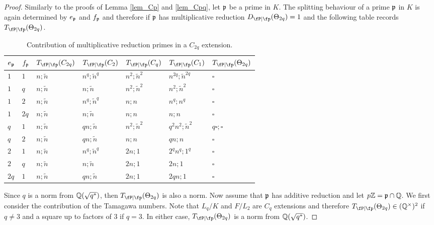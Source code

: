 \begin{proof}
    Similarly to the proofs of Lemma \ref{lem_Cp} and \ref{lem_Cpq}, let $\mathfrak{p}$ be a prime in $K$. The splitting behaviour of a prime $\mathfrak{p}$ in $K$ is again determined by $e_{\mathfrak{p}}$ and $f_{\mathfrak{p}}$ and therefore if $\mathfrak{p}$ has multiplicative reduction $\Dp(\Theta_{2q})=1$ and the following table records $\Tp(\Theta_{2q})$.

    \begin{table}[!ht]
        \centering
        \begin{tabular}{|l|l|l|l|l|l|l|}
        \hline
        $e_{\mathfrak{p}}$ & $f_{\mathfrak{p}}$  & $\Tp(C_{2q})$ & $\Tp(C_2)$ & $\Tp(C_q)$ & $\Tp(C_1)$ & $\Tp(\Theta_{2q})$ \\ \hline
        $1$ & $1$ & $n;\tilde{n}$ & $n^q;\tilde{n}^q$ & $n^2;\tilde{n}^2$ & $n^{2q};\tilde{n}^{2q}$ & $\square$ \\ \hline
        $1$ & $q$ & $n;\tilde{n}$ & $n;\tilde{n}$ & $n^2;\tilde{n}^2$ & $n^2;\tilde{n}^2$ & $\square$ \\ \hline
        $1$ & $2$ & $n;\tilde{n}$ & $n^q;\tilde{n}^q$ & $n;n$ & $n^q;n^q$ & $\square$ \\ \hline
        $1$ & $2q$ & $n;\tilde{n}$ & $n;\tilde{n}$ & $n;n$ & $n;n$ & $\square$ \\ \hline
        $q$ & $1$ & $n;\tilde{n}$ & $qn;\tilde{n}$ & $n^2;\tilde{n}^2$ & $q^2n^2;\tilde{n}^2$ & $q\square;\square$ \\ \hline
        $q$ & $2$ & $n;\tilde{n}$ & $qn;\tilde{n}$ & $n;n$ & $qn;n$ & $\square$ \\ \hline
        $2$ & $1$ & $n;\tilde{n}$ & $n^q;\tilde{n}^q$ & $2n;1$ & $2^qn^q;1^q$ & $\square$ \\ \hline
        $2$ & $q$ & $n;\tilde{n}$ & $n;\tilde{n}$ & $2n;1$ & $2n;1$ & $\square$ \\ \hline
        $2q$ & $1$ & $n;\tilde{n}$ & $qn;\tilde{n}$ & $2n;1$ & $2qn;1$ & $\square$ \\ \hline
        \end{tabular}
        \caption{Contribution of multiplicative reduction primes in a $C_{2q}$ extension.}
    \end{table}

    Since $q$ is a norm from $\mathbb{Q}(\sqrt{q^*})$, then $\Tp(\Theta_{2q})$ is also a norm. Now assume that $\mathfrak{p}$ has additive reduction and let $p\mathbb{Z}=\mathfrak{p}\cap\mathbb{Q}$. We first consider the contribution of the Tamagawa numbers. Note that $L_q/K$ and $F/L_2$ are $C_q$ extensions and therefore $\Tp(\Theta_{2q})\in\QQss$ if $q\neq 3$ and a square up to factors of $3$ if $q=3$. In either case, $\Tp(\Theta_{2q})$ is a norm from $\mathbb{Q}(\sqrt{q^*})$.


\end{proof}
